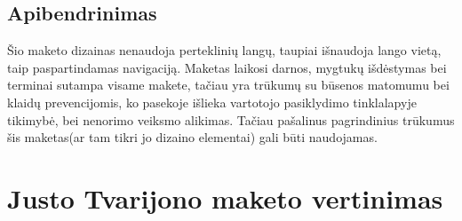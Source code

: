 \documentclass[oneside]{VUMIFPSkursinis}
\begin{document}
\subsection{Apibendrinimas}
Šio maketo dizainas nenaudoja perteklinių langų, taupiai išnaudoja lango vietą, taip paspartindamas navigaciją. Maketas laikosi darnos, mygtukų išdėstymas bei terminai sutampa visame makete, tačiau yra trūkumų su būsenos matomumu bei klaidų prevencijomis, ko pasekoje išlieka vartotojo pasiklydimo tinklalapyje tikimybė, bei nenorimo veiksmo alikimas. Tačiau pašalinus pagrindinius trūkumus šis maketas(ar tam tikri jo dizaino elementai) gali būti naudojamas.

\section{Justo Tvarijono maketo vertinimas}
\end{document}
